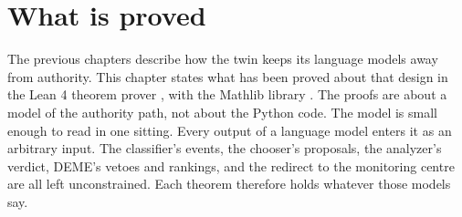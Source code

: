 \chapter{What is proved}\label{ch:lean}

The previous chapters describe how the twin keeps its language models away from authority.
This chapter states what has been proved about that design in the Lean 4 theorem prover
\cite{demoura2021lean4}, with the Mathlib library \cite{mathlib2020}.
The proofs are about a model of the authority path, not about the Python code.
The model is small enough to read in one sitting.
Every output of a language model enters it as an arbitrary input.
The classifier's events, the chooser's proposals, the analyzer's verdict, DEME's vetoes and
rankings, and the redirect to the monitoring centre are all left unconstrained.
Each theorem therefore holds whatever those models say.

